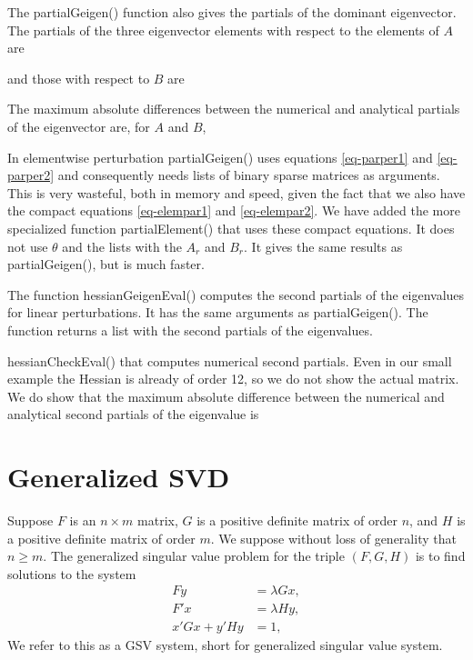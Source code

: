 \documentclass[
  12pt,
  letterpaper,
  DIV=11,
  numbers=noendperiod]{scrartcl}
\newcommand{\sectionbreak}{\clearpage}
\begin{document}
The partialGeigen() function also gives the partials of the dominant
eigenvector. The partials of the three eigenvector elements with respect
to the elements of \(A\) are

and those with respect to \(B\) are

The maximum absolute differences between the numerical and analytical
partials of the eigenvector are, for \(A\) and \(B\),

In elementwise perturbation partialGeigen() uses equations
\eqref{eq-parper1} and \eqref{eq-parper2} and consequently needs lists
of binary sparse matrices as arguments. This is very wasteful, both in
memory and speed, given the fact that we also have the compact equations
\eqref{eq-elempar1} and \eqref{eq-elempar2}. We have added the more
specialized function partialElement() that uses these compact equations.
It does not use \(\theta\) and the lists with the \(A_r\) and \(B_r\).
It gives the same results as partialGeigen(), but is much faster.

The function hessianGeigenEval() computes the second partials of the
eigenvalues for linear perturbations. It has the same arguments as
partialGeigen(). The function returns a list with the second partials of
the eigenvalues.

hessianCheckEval() that computes numerical second partials. Even in our
small example the Hessian is already of order 12, so we do not show the
actual matrix. We do show that the maximum absolute difference between
the numerical and analytical second partials of the eigenvalue is

\sectionbreak

\section{Generalized SVD}\label{sec-GSV}

Suppose \(F\) is an \(n\times m\) matrix, \(G\) is a positive definite
matrix of order \(n\), and \(H\) is a positive definite matrix of order
\(m\). We suppose without loss of generality that \(n\geq m\). The
generalized singular value problem for the triple \((F,G,H)\) is to find
solutions to the system \begin{subequations}
\begin{align}
Fy&=\lambda Gx,\label{eq-svd1}\\
F'x&=\lambda Hy,\label{eq-svd2}\\
x'Gx+y'Hy&=1,\label{eq-svd3}
\end{align}
\end{subequations} We refer to this as a GSV system, short for
generalized singular value system.
\end{document}
